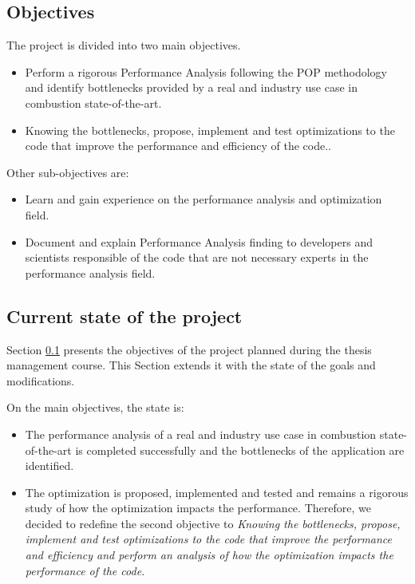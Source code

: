 \subsection{Objectives}\label{sec:objectives}

\justify
The project is divided into two main objectives.
\begin{itemize}
  \item Perform a rigorous Performance Analysis following the POP methodology and identify bottlenecks provided by a real and industry use case in combustion state-of-the-art.
  \item Knowing the bottlenecks, propose, implement and test optimizations to the code that improve the performance and efficiency of the code..
\end{itemize}

\justify
Other sub-objectives are:
\begin{itemize}
  \item Learn and gain experience on the performance analysis and optimization field.
  \item Document and explain Performance Analysis finding to developers and scientists responsible of the code that are not necessary experts in the performance analysis field.  
\end{itemize}

\subsection{Current state of the project}

Section \ref{sec:objectives} presents the objectives of the project planned during the thesis management course. This Section extends it with the state of the goals and modifications.

On the main objectives, the state is:

\begin{itemize}
  \item The performance analysis of a real and industry use case in combustion state-of-the-art is completed successfully and the bottlenecks of the application are identified.

  \item The optimization is proposed, implemented and tested and remains a rigorous study of how the optimization impacts the performance. Therefore, we decided to redefine the second objective to \textit{Knowing the bottlenecks, propose, implement and test optimizations to the code that improve the performance and efficiency and perform an analysis of how the optimization impacts the performance of the code.}
\end{itemize}


